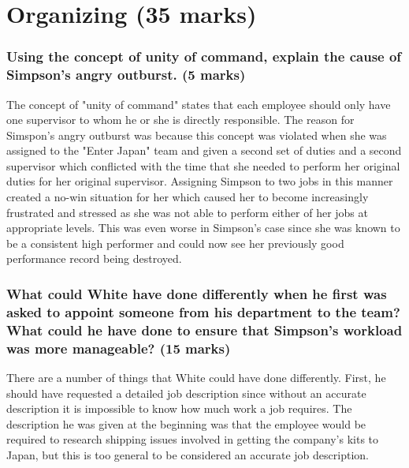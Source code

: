 \documentclass[12pt,titlepage]{article}
\begin{document}
\part{Organizing (35 marks)}
\setcounter{section}{0}

\section{Using the concept of unity of command, explain the cause of Simpson's angry outburst. (5 marks)}

The concept of "unity of command" states that each employee should only have one supervisor to whom he or she is directly responsible. The reason for Simspon's angry outburst was because this concept was violated when she was assigned to the "Enter Japan" team and given a second set of duties and a second supervisor which conflicted with the time that she needed to perform her original duties for her original supervisor. Assigning Simpson to two jobs in this manner created a no-win situation for her which caused her to become increasingly frustrated and stressed as she was not able to perform either of her jobs at appropriate levels. This was even worse in Simpson's case since she was known to be a consistent high performer and could now see her previously good performance record being destroyed. 

\section{What could White have done differently when he first was asked to appoint someone from his department to the team? What could he have done to ensure that Simpson's workload was more manageable? (15 marks)}

There are a number of things that White could have done differently. First, he should have requested a detailed job description since without an accurate description it is impossible to know how much work a job requires. The description he was given at the beginning was that the employee would be required to research shipping issues involved in getting the company's kits to Japan, but this is too general to be considered an accurate job description. 
\end{document}
